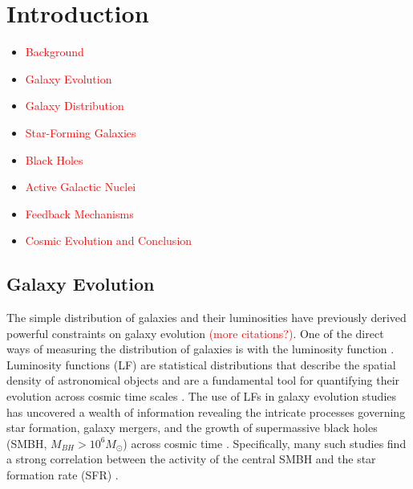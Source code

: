 \chapter{Introduction}
\thispagestyle{empty}

\begin{itemize}
    \item \textcolor{red}{Background}
    \item \textcolor{red}{Galaxy Evolution}
    \item \textcolor{red}{Galaxy Distribution}
    \item \textcolor{red}{Star-Forming Galaxies}
    \item \textcolor{red}{Black Holes}
    \item \textcolor{red}{Active Galactic Nuclei}
    \item \textcolor{red}{Feedback Mechanisms}
    \item \textcolor{red}{Cosmic Evolution and Conclusion}
\end{itemize}

\section{Galaxy Evolution}
The simple distribution of galaxies and their luminosities have previously derived powerful constraints on galaxy evolution \citep{biviano_spitzer_2011} \textcolor{red}{(more citations?)}. One of the direct ways of measuring the distribution of galaxies is with the luminosity function \citep{schechter_analytic_1976, saunders_60-mum_1990}. Luminosity functions (LF) are statistical distributions that describe the spatial density of astronomical objects and are a fundamental tool for quantifying their evolution across cosmic time scales \citep{dai_mid-infrared_2009, han_evolution_2012, wylezalek_galaxy_2014}. The use of LFs in galaxy evolution studies has uncovered a wealth of information revealing the intricate processes governing star formation, galaxy mergers, and the growth of supermassive black holes (SMBH, $M_{BH} > 10^{6} M_{\odot}$) across cosmic time \citep{caputi_infrared_2007, hopkins_observational_2007, rodighiero_mid-_2010, gruppioni_modelling_2011, gruppioni_herschel_2013, magnelli_deepest_2013, delvecchio_tracing_2014, hernan-caballero_resolving_2015, symeonidis_agn_2021, thorne_deep_2022}. Specifically, many such studies find a strong correlation between the activity of the central SMBH and the star formation rate (SFR) \citep{hopkins_cosmological_2008, merloni_synthesis_2008}. 

